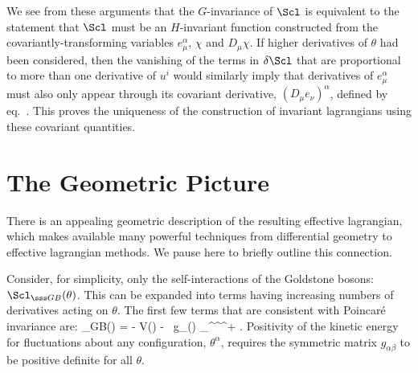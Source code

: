 \documentclass[12pt]{report}
\begin{document}
We see from these arguments that the $G$-invariance of
$\Scl$ is equivalent to the statement that $\Scl$ must be
an $H$-invariant function constructed from the
covariantly-transforming variables $e^\alpha_\mu$, $\chi$
and $D_\mu \chi$. If higher derivatives of $\theta$ had
been considered, then the vanishing of the terms in 
$\delta \Scl$ that are proportional to more than one
derivative of $u^i$ would similarly imply that derivatives
of $e^\alpha_\mu$ must also only appear through its
covariant derivative, $(D_\mu e_\nu)^\alpha$, defined by
eq.~. This proves the uniqueness of the
construction of invariant lagrangians using these covariant
quantities.

\section{The Geometric Picture}

There is an appealing geometric description of the
resulting effective lagrangian, which makes available many
powerful techniques from differential geometry to effective
lagrangian methods. We pause here to briefly outline this
connection.

Consider, for simplicity, only the self-interactions of the
Goldstone bosons: $\Scl_{\sss GB}(\theta)$. This can be
expanded into terms having increasing numbers of
derivatives acting on $\theta$. The first few terms that
are consistent with Poincar\'e invariance are:  
%
\eq
\label{gblagronly}
\Scl_{\sss GB}(\theta) = - V(\theta) - \hf \, 
g_{\alpha\beta}(\theta) \;
\partial_\mu \theta^\alpha \partial^\mu \theta^\beta +
\cdots .
\eeq
%
Positivity of the kinetic energy for fluctuations about any
configuration, $\theta^\alpha$, requires the symmetric
matrix $g_{\alpha\beta}$ to be positive definite for all
$\theta$.
\end{document}
